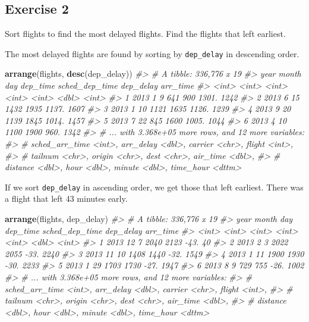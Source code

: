 \documentclass[]{book}
\newenvironment{Shaded}{\begin{snugshade}}{\end{snugshade}}
\newcommand{\CommentTok}[1]{\textcolor[rgb]{0.56,0.35,0.01}{\textit{#1}}}
\newcommand{\KeywordTok}[1]{\textcolor[rgb]{0.13,0.29,0.53}{\textbf{#1}}}
\newcommand{\NormalTok}[1]{#1}
\theoremstyle{definition}
\theoremstyle{definition}
\theoremstyle{definition}
\theoremstyle{remark}
\begin{document}
\hypertarget{exercise-2-2}{%
\subsection{Exercise 2}\label{exercise-2-2}}

Sort flights to find the most delayed flights. Find the flights that
left earliest.

The most delayed flights are found by sorting by \texttt{dep\_delay} in
descending order.

\begin{Shaded}
\begin{Highlighting}[]
\KeywordTok{arrange}\NormalTok{(flights, }\KeywordTok{desc}\NormalTok{(dep_delay))}
\CommentTok{#> # A tibble: 336,776 x 19}
\CommentTok{#>    year month   day dep_time sched_dep_time dep_delay arr_time}
\CommentTok{#>   <int> <int> <int>    <int>          <int>     <dbl>    <int>}
\CommentTok{#> 1  2013     1     9      641            900     1301.     1242}
\CommentTok{#> 2  2013     6    15     1432           1935     1137.     1607}
\CommentTok{#> 3  2013     1    10     1121           1635     1126.     1239}
\CommentTok{#> 4  2013     9    20     1139           1845     1014.     1457}
\CommentTok{#> 5  2013     7    22      845           1600     1005.     1044}
\CommentTok{#> 6  2013     4    10     1100           1900      960.     1342}
\CommentTok{#> # ... with 3.368e+05 more rows, and 12 more variables:}
\CommentTok{#> #   sched_arr_time <int>, arr_delay <dbl>, carrier <chr>, flight <int>,}
\CommentTok{#> #   tailnum <chr>, origin <chr>, dest <chr>, air_time <dbl>,}
\CommentTok{#> #   distance <dbl>, hour <dbl>, minute <dbl>, time_hour <dttm>}
\end{Highlighting}
\end{Shaded}

If we sort \texttt{dep\_delay} in ascending order, we get those that
left earliest. There was a flight that left 43 minutes early.

\begin{Shaded}
\begin{Highlighting}[]
\KeywordTok{arrange}\NormalTok{(flights, dep_delay)}
\CommentTok{#> # A tibble: 336,776 x 19}
\CommentTok{#>    year month   day dep_time sched_dep_time dep_delay arr_time}
\CommentTok{#>   <int> <int> <int>    <int>          <int>     <dbl>    <int>}
\CommentTok{#> 1  2013    12     7     2040           2123      -43.       40}
\CommentTok{#> 2  2013     2     3     2022           2055      -33.     2240}
\CommentTok{#> 3  2013    11    10     1408           1440      -32.     1549}
\CommentTok{#> 4  2013     1    11     1900           1930      -30.     2233}
\CommentTok{#> 5  2013     1    29     1703           1730      -27.     1947}
\CommentTok{#> 6  2013     8     9      729            755      -26.     1002}
\CommentTok{#> # ... with 3.368e+05 more rows, and 12 more variables:}
\CommentTok{#> #   sched_arr_time <int>, arr_delay <dbl>, carrier <chr>, flight <int>,}
\CommentTok{#> #   tailnum <chr>, origin <chr>, dest <chr>, air_time <dbl>,}
\CommentTok{#> #   distance <dbl>, hour <dbl>, minute <dbl>, time_hour <dttm>}
\end{Highlighting}
\end{Shaded}
\end{document}
